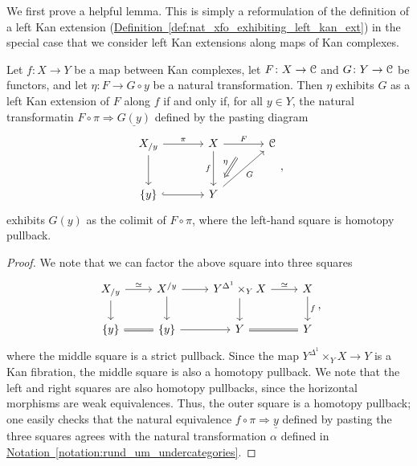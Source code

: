 \documentclass[main.tex]{subfiles}
\begin{document}
We first prove a helpful lemma. This is simply a reformulation of the definition of a left Kan extension (\hyperref[def:nat_xfo_exhibiting_left_kan_ext]{Definition~\ref*{def:nat_xfo_exhibiting_left_kan_ext}}) in the special case that we consider left Kan extensions along maps of Kan complexes.
\begin{lemma}
  \label{lemma:left_kan_ext_along_kan_complexes}
  Let $f\colon X \to Y$ be a map between Kan complexes, let $F\colon X \to \mathcal{C}$ and $G\colon Y \to \mathcal{C}$ be functors, and let $\eta\colon F \to G \circ y$ be a natural transformation. Then $\eta$ exhibits $G$ as a left Kan extension of $F$ along $f$ if and only if, for all $y \in Y$, the natural transformatin $F \circ \pi \Rightarrow \underline{G(y)}$ defined by the pasting diagram
  \begin{equation*}
    \begin{tikzcd}[row sep=large, column sep=large]
      X_{/y}
      \arrow[r, "\pi", ""{name=LA, swap}]
      \arrow[d, ""{name=LD}]
      & X
      \arrow[d, swap, "f"]
      \arrow[r, "F", ""{below, name=M}]
      & \category{C}
      \\
      \{y\}
      \arrow[r, hook, ""{name=LB}]
      & Y
      \arrow[ur, swap, "G"]
      \arrow[from=M, Rightarrow, shorten=2ex, swap, "\eta"]
    \end{tikzcd},
  \end{equation*}
  exhibits $G(y)$ as the colimit of $F \circ \pi$, where the left-hand square is homotopy pullback.
\end{lemma}
\begin{proof}
  We note that we can factor the above square into three squares
  \begin{equation*}
    \begin{tikzcd}
      X_{/y}
      \arrow[r, "\simeq"]
      \arrow[d]
      & X^{/y}
      \arrow[r]
      \arrow[d]
      & Y^{\Delta^{1}} \times_{Y} X
      \arrow[r, "\simeq"]
      \arrow[d]
      & X
      \arrow[d, "f"]
      \\
      \{y\}
      \arrow[r, equals]
      & \{y\}
      \arrow[r]
      & Y
      \arrow[r, equals]
      & Y
    \end{tikzcd},
  \end{equation*}
  where the middle square is a strict pullback. Since the map $Y^{\Delta^{1}} \times_{Y}X \to Y$ is a Kan fibration, the middle square is also a homotopy pullback. We note that the left and right squares are also homotopy pullbacks, since the horizontal morphisms are weak equivalences. Thus, the outer square is a homotopy pullback; one easily checks that the natural equivalence $f \circ \pi \Rightarrow \underline{y}$ defined by pasting the three squares agrees with the natural transformation $\alpha$ defined in \hyperref[notation:rund_um_undercategories]{Notation~\ref*{notation:rund_um_undercategories}}.
\end{proof}
\end{document}

